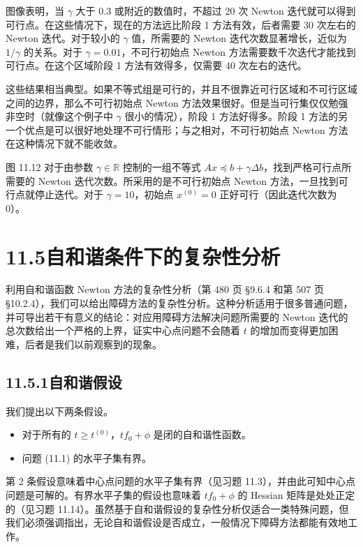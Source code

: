 \documentclass[UTF8, 12pt, fontset=fandol, oneside]{ctexart}
\begin{document}
图像表明，当 $\gamma$ 大于 $0.3$ 或附近的数值时，不超过 20 次 Newton 迭代就可以得到可行点。在这些情况下，现在的方法远比阶段 1 方法有效，后者需要 30 次左右的 Newton 迭代。对于较小的 $\gamma$ 值，所需要的 Newton 迭代次数显著增长，近似为 $1/\gamma$ 的关系。对于 $\gamma=0.01$，不可行初始点 Newton 方法需要数千次迭代才能找到可行点。在这个区域阶段 1 方法有效得多，仅需要 40 次左右的迭代。

这些结果相当典型。如果不等式组是可行的，并且不很靠近可行区域和不可行区域之间的边界，那么不可行初始点 Newton 方法效果很好。但是当可行集仅仅勉强非空时（就像这个例子中 $\gamma$ 很小的情况），阶段 1 方法好得多。阶段 1 方法的另一个优点是可以很好地处理不可行情形；与之相对，不可行初始点 Newton 方法在这种情况下就不能收敛。

图 11.12 对于由参数 $\gamma\in\mathbb{R}$ 控制的一组不等式 $Ax\preceq b+\gamma\Delta b$，找到严格可行点所需要的 Newton 迭代次数。所采用的是不可行初始点 Newton 方法，一旦找到可行点就停止迭代。对于 $\gamma=10$，初始点 $x^{(0)}=0$ 正好可行（因此迭代次数为 0）。

\section*{11.5\quad 自和谐条件下的复杂性分析}

利用自和谐函数 Newton 方法的复杂性分析（第 480 页 \S9.6.4 和第 507 页 \S10.2.4），我们可以给出障碍方法的复杂性分析。这种分析适用于很多普通问题，并可导出若干有意义的结论：对应用障碍方法解决问题所需要的 Newton 迭代的总次数给出一个严格的上界，证实中心点问题不会随着 $t$ 的增加而变得更加困难，后者是我们以前观察到的现象。

\subsection*{11.5.1\quad 自和谐假设}

我们提出以下两条假设。

\begin{itemize}
\item 对于所有的 $t\geq t^{(0)}$，$tf_0+\phi$ 是闭的自和谐性函数。
\item 问题 (11.1) 的水平子集有界。
\end{itemize}

第 2 条假设意味着中心点问题的水平子集有界（见习题 11.3），并由此可知中心点问题是可解的。有界水平子集的假设也意味着 $tf_0+\phi$ 的 Hessian 矩阵是处处正定的（见习题 11.14）。虽然基于自和谐假设的复杂性分析仅适合一类特殊问题，但我们必须强调指出，无论自和谐假设是否成立，一般情况下障碍方法都能有效地工作。
\end{document}
